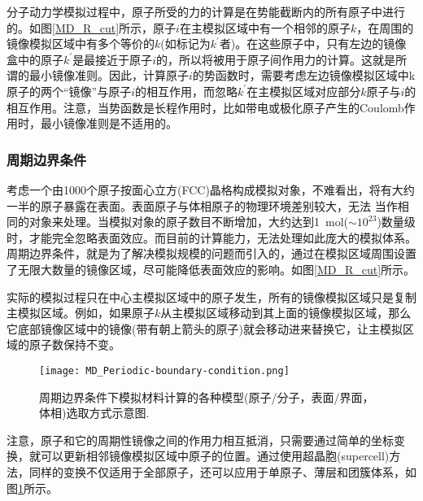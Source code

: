 分子动力学模拟过程中，原子所受的力的计算是在势能截断内的所有原子中进行的。如图\ref{MD_R_cut}所示，原子$i$在主模拟区域中有一个相邻的原子$k$，在周围的镜像模拟区域中有多个等价的$k$(如标记为$k^{\prime}$者)。在这些原子中，只有左边的镜像盒中的原子$k^{\prime}$是最接近于原子$i$的，所以将被用于原子间作用力的计算。这就是所谓的最小镜像准则。因此，计算原子$i$的势函数时，需要考虑左边镜像模拟区域中k原子的两个``镜像''与原子$i$的相互作用，而忽略$k^{\prime}$在主模拟区域对应部分$k$原子与$i$的相互作用。注意，当势函数是长程作用时，比如带电或极化原子产生的\textrm{Coulomb}作用时，最小镜像准则是不适用的。
\subsubsection{周期边界条件}
考虑一个由1000个原子按面心立方\textrm{(FCC)}晶格构成模拟对象，不难看出，将有大约一半的原子暴露在表面。表面原子与体相原子的物理环境差别较大，无法
当作相同的对象来处理。当模拟对象的原子数目不断增加，大约达到1~\textrm{mol}($\sim10^{23}$)数量级时，才能完全忽略表面效应。而目前的计算能力，无法处理如此庞大的模拟体系。周期边界条件\cite{PZ13-297_1912}，就是为了解决模拟规模的问题而引入的，通过在模拟区域周围设置了无限大数量的镜像区域，尽可能降低表面效应的影响。如图\ref{MD_R_cut}所示。

实际的模拟过程只在中心主模拟区域中的原子发生，所有的镜像模拟区域只是复制主模拟区域。例如，如果原子$k$从主模拟区域移动到其上面的镜像模拟区域，那么它底部镜像区域中的镜像(带有朝上箭头的原子)就会移动进来替换它，让主模拟区域的原子数保持不变。
\begin{figure}[h!]
\centering
\vspace*{-0.1in}
\texttt{[image: MD\_Periodic-boundary-condition.png]}
\caption{{周期边界条件下模拟材料计算的各种模型(原子/分子，表面/界面，体相)选取方式示意图.}}%
\label{MD_Periodic}
\end{figure}
注意，原子和它的周期性镜像之间的作用力相互抵消，只需要通过简单的坐标变换，就可以更新相邻镜像模拟区域中原子的位置。通过使用超晶胞\textrm{(supercell)}方法，同样的变换不仅适用于全部原子，还可以应用于单原子、薄层和团簇体系，如图\ref{MD_Periodic}所示。
